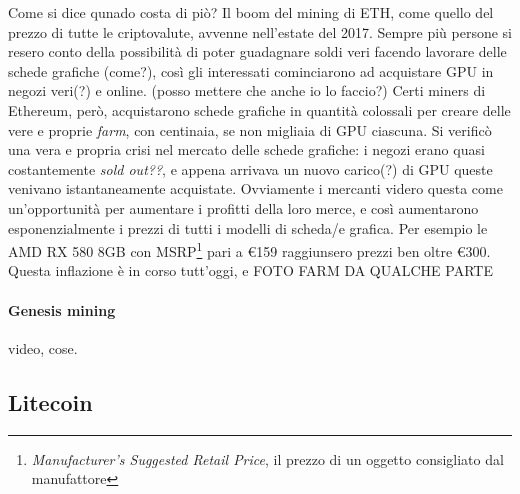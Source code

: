 \documentclass {article}
\begin{document}
Come si dice qunado costa di piò?
Il boom del mining di ETH, come quello del prezzo di tutte le criptovalute, avvenne nell'estate del 2017.
Sempre più persone si resero conto della possibilità di poter guadagnare soldi veri facendo lavorare delle schede grafiche (come?), così gli interessati cominciarono ad acquistare GPU in negozi veri(?) e online. (posso mettere che anche io lo faccio?)
Certi miners di Ethereum, però, acquistarono schede grafiche in quantità colossali per creare delle vere e proprie \textit{farm}, con centinaia, se non migliaia di GPU ciascuna.
Si verificò una vera e propria crisi nel mercato delle schede grafiche: i negozi erano quasi costantemente \textit{sold out??}, e appena arrivava un nuovo carico(?) di GPU queste venivano istantaneamente acquistate.
Ovviamente i mercanti videro questa come un'opportunità per aumentare i profitti della loro merce, e così aumentarono esponenzialmente i prezzi di tutti i modelli di scheda/e grafica.
Per esempio le AMD RX 580 8GB con MSRP\footnote{\textit{Manufacturer's Suggested Retail Price}, il prezzo di un oggetto consigliato dal manufattore} pari a \euro{159} raggiunsero prezzi ben oltre \euro{300}.
Questa inflazione è in corso tutt'oggi, e FOTO FARM DA QUALCHE PARTE

\paragraph {Genesis mining}

video, cose.


\subsection {Litecoin}
\end{document}
